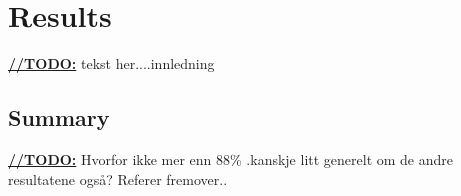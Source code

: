 \chapter{Results}
\underline{\textbf{\LARGE //TODO:}} tekst her....innledning




\section{Summary}
\underline{\textbf{\LARGE //TODO:}} Hvorfor ikke mer enn 88\% .kanskje litt generelt om de andre resultatene ogs\aa ? Referer fremover..